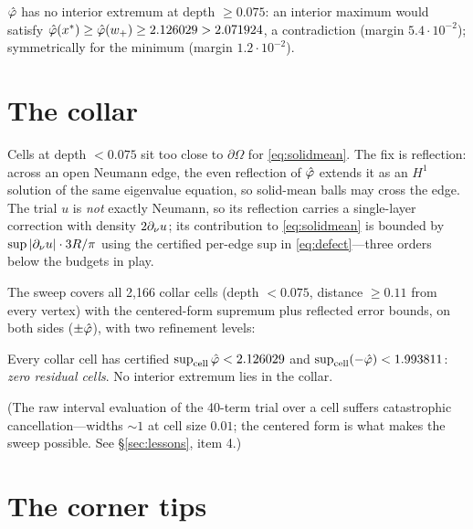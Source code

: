 \documentclass[11pt]{article}
\begin{document}
\begin{lemma}\label{lem:core}
$\hat\varphi$ has no interior extremum at depth $\ge 0.075$: an interior
maximum would satisfy
$\hat\varphi(x^*)\ge\hat\varphi(w_+)\ge 2.126029>2.071924$, a contradiction
(margin $5.4\cdot10^{-2}$); symmetrically for the minimum
(margin $1.2\cdot10^{-2}$).
\end{lemma}

\section{The collar}\label{sec:collar}

Cells at depth $<0.075$ sit too close to $\partial\Omega$ for
\eqref{eq:solidmean}. The fix is reflection: across an open Neumann
edge, the even reflection of $\hat\varphi$ extends it as an $H^1$ solution of
the same eigenvalue equation, so solid-mean balls may cross the edge.
The trial $u$ is \emph{not} exactly Neumann, so its reflection carries a
single-layer correction with density $2\partial_\nu u$; its contribution to
\eqref{eq:solidmean} is bounded by
$\sup|\partial_\nu u|\cdot 3R/\pi$ using the certified per-edge sup in
\eqref{eq:defect}---three orders below the budgets in play.

The sweep covers all 2{,}166 collar cells (depth $<0.075$, distance
$\ge0.11$ from every vertex) with the centered-form supremum plus
reflected error bounds, on both sides ($\pm\hat\varphi$), with two refinement
levels:

\begin{lemma}[collar]\label{lem:collar}
Every collar cell has certified
$\sup_{\mathrm{cell}}\hat\varphi < 2.126029$ and
$\sup_{\mathrm{cell}}(-\hat\varphi) < 1.993811$: \emph{zero residual cells}.
No interior extremum lies in the collar.
\end{lemma}

(The raw interval evaluation of the 40-term trial over a cell suffers
catastrophic cancellation---widths ${\sim}1$ at cell size $0.01$; the
centered form is what makes the sweep possible. See
\S\ref{sec:lessons}, item 4.)

\section{The corner tips}\label{sec:tips}
\end{document}
